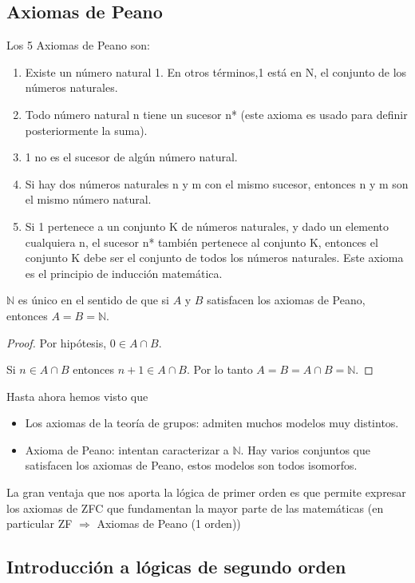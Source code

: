 \subsection{Axiomas de Peano}
	Los 5 Axiomas de Peano son:
	\begin{enumerate}
		\item Existe un número natural 1. En otros términos,1 está en N, el conjunto de los números naturales.
		\item Todo número natural n tiene un sucesor n* (este axioma es usado para definir posteriormente la suma).
		\item 1 no es el sucesor de algún número natural.
		\item Si hay dos números naturales n y m con el mismo sucesor, entonces n y m son el mismo número natural.
		\item Si 1 pertenece a un conjunto K de números naturales, y dado un elemento cualquiera n, el sucesor n* también pertenece al conjunto K, entonces el conjunto K debe ser el conjunto de todos los números naturales. Este axioma es el principio de inducción matemática.
	\end{enumerate}

	\begin{theorem}
		$\mathbb{N}$ es único en el sentido de que si $A$ y $B$ satisfacen los axiomas de Peano, entonces $A=B=\mathbb{N}$.
	\end{theorem}
	\begin{proof}
		Por hipótesis, $0\in A\cap B$.

		Si $n\in A\cap B$ entonces $n+1\in A\cap B$. Por lo tanto $A=B=A\cap B=\mathbb{N}$.
	\end{proof}

	Hasta ahora hemos visto que
	\begin{itemize}
		\item Los axiomas de la teoría de grupos: admiten muchos modelos muy distintos.
		\item Axioma de Peano: intentan caracterizar a $\mathbb{N}$. Hay varios conjuntos que satisfacen los axiomas de Peano, estos modelos son todos isomorfos.
	\end{itemize}

La gran ventaja que nos aporta la lógica de primer orden es que permite expresar los axiomas de ZFC que fundamentan la mayor parte de las matemáticas (en particular ZF $\Rightarrow$ Axiomas de Peano (1 orden))

\subsection{Introducción a lógicas de segundo orden}

